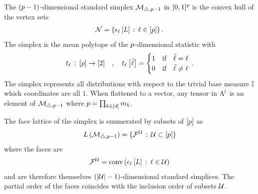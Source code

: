 \begin{example}[Simplices]
    \label{exa:simplexFaces}
    The $(p-1)$-dimensional standard simplex $\mathcal{M}_{\triangle,p-1}$ in $[0,1]^{p}$ is the convex hull of the vertex sets
    \begin{align*}
        \mathcal{N} = \{\epsilon_{\ell}\left[L\right] \,:\,\ell\in[p]\} \, .
    \end{align*}
    The simplex is the mean polytope of the $p$-dimensional statistic with
    \begin{align*}
        t_{\ell} \,:\, [p] \rightarrow [2] \quad, \quad
        t_{\ell}\left[\tilde{\ell}\right]
        = \begin{cases}
              1 & \text{if}\quad \tilde{\ell} = \ell \\
              0 & \text{if}\quad \tilde{\ell} \neq \ell
        \end{cases} \, .
    \end{align*}
    The simplex represents all distributions with respect to the trivial base measure $\mathbb{I}$ which coordinates are all $1$.
    When flattened to a vector, any tensor in $\Lambda^{\mathbb{I}}$ is an element of $\mathcal{M}_{\triangle,p-1}$ where $p=\prod_{k\in[d]}m_{k}$.

    The face lattice of the simplex is enumerated by subsets of $[p]$ as
    \begin{align*}
        L\left(\mathcal{M}_{\triangle,p-1}\right)
        = \{\mathcal{F}^{\mathcal{U}}\,:\,\mathcal{U}\subset[p]\}
    \end{align*}
    where the faces are
    \begin{align*}
        \mathcal{F}^{\mathcal{U}}
        = \mathrm{conv}\left(\epsilon_{\ell}\left[L\right] \,:\,\ell\in\mathcal{U}\right)
    \end{align*}
    and are therefore themselves $(\left|\mathcal{U}\right|-1)$-dimensional standard simplices.
    The partial order of the faces coincides with the inclusion order of subsets $\mathcal{U}$.
\end{example}